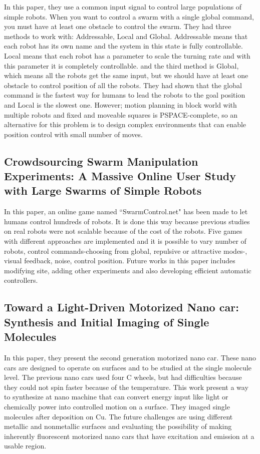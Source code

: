 \documentclass[letterpaper, 10 pt, conference]{ieeeconf}
\begin{document}
In this paper, they use a common input signal to control large populations of simple robots. When you want to control a swarm with a single global command, you must have at least one obstacle to control the swarm. They had three methods to work with: Addressable, Local and Global. Addressable means that each robot has its own name and the system in this state is fully controllable. Local means that each robot has a parameter to scale the turning rate and with this parameter it is completely controllable. and the third method is Global, which means all the robots get the same input, but we should have at least one obstacle to control position of all the robots. They had shown that the global command is the fastest way for humans to lead the robots to the goal position and Local is the slowest one. However; motion planning in block world with multiple robots and fixed and moveable squares is PSPACE-complete, so an alternative for this problem is to design complex environments that can enable position control with small number of moves. \cite{AaronManipulation2013}

\subsection{Crowdsourcing Swarm Manipulation Experiments: A Massive Online User Study with Large Swarms of Simple Robots}

In this paper, an online game named ``SwarmControl.net" has been made to let humans control hundreds of robots. It is done this way because previous studies on real robots were not scalable because of the cost of the robots. Five games with different approaches are implemented and it is possible to vary number of robots, control commands-choosing from global, repulsive or attractive modes-, visual feedback, noise, control position. Future works in this paper includes modifying site, adding other experiments and also developing efficient automatic controllers. \cite{swarmcontrol2013}

\subsection{Toward a Light-Driven Motorized Nano car: Synthesis and Initial Imaging of Single Molecules}

In this paper, they present the second generation motorized nano car. These nano cars are designed to operate on surfaces and to be studied at the single molecule level. The previous nano cars used four C wheels, but had difficulties because they could not spin faster because of the temperature. This work present a way to synthesize at nano machine that can convert energy input like light or chemically power into controlled motion on a surface. They imaged single molecules after deposition on Cu. The future challenges are using different metallic and nonmetallic surfaces and evaluating the possibility of making inherently fluorescent motorized nano cars that have excitation and emission at a usable region. \cite{TourNanocar2012}
\end{document}
